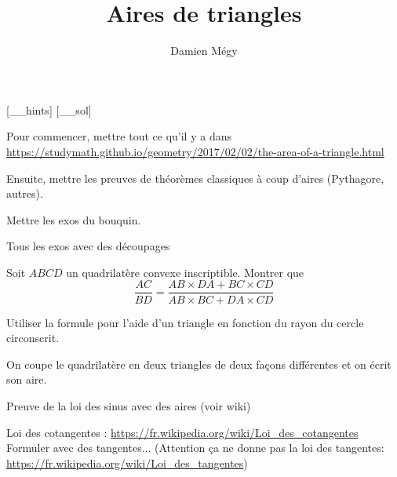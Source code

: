 




[_\jobname_hints]
[_\jobname_sol]


\title{Aires de triangles}
\author{Damien Mégy}
\maketitle

\avertissement 

Pour commencer, mettre tout ce qu'il y a dans \url{https://studymath.github.io/geometry/2017/02/02/the-area-of-a-triangle.html}

Ensuite, mettre les preuves de théorèmes classiques à coup d'aires (Pythagore, autres).

Mettre les exos du bouquin.

Tous les exos avec des découpages

\begin{exo}
Soit $ABCD$ un quadrilatère convexe inscriptible.
Montrer que
\[ \frac{AC}{BD} = \frac{AB\times DA + BC\times CD}{AB\times BC + DA\times CD}\]
\begin{hint}
Utiliser la formule pour l'aide d'un triangle en fonction du rayon du cercle circonscrit.
\end{hint}
\begin{sol}
On coupe le quadrilatère en deux triangles de deux façons différentes et on écrit son aire.
\end{sol}
\end{exo}



Preuve de la loi des sinus avec des aires (voir wiki)


Loi des cotangentes : \url{https://fr.wikipedia.org/wiki/Loi_des_cotangentes} Formuler avec des tangentes...
(Attention ça ne donne pas la l\og oi des tangentes\fg : \url{https://fr.wikipedia.org/wiki/Loi_des_tangentes})



\indications
\correction



